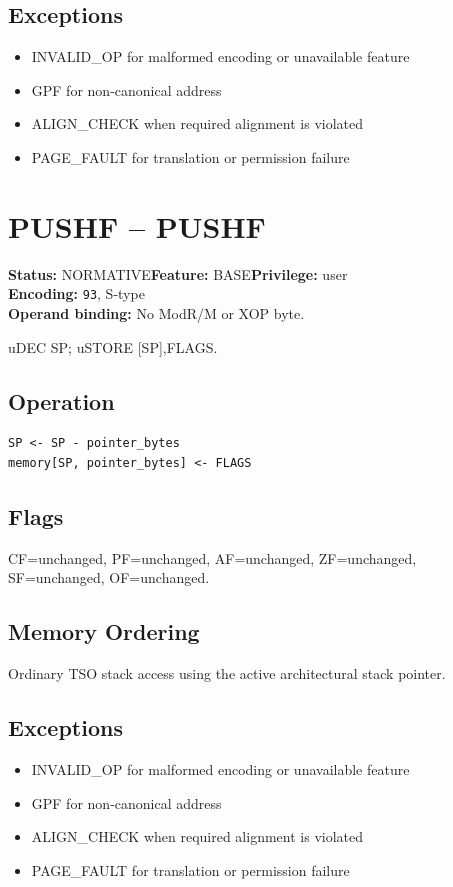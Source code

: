 \documentclass[10pt]{article}
\begin{document}
\subsection*{Exceptions}
\begin{itemize}
\item INVALID\_OP for malformed encoding or unavailable feature
\item GPF for non-canonical address
\item ALIGN\_CHECK when required alignment is violated
\item PAGE\_FAULT for translation or permission failure
\end{itemize}
\clearpage

\section{PUSHF -- PUSHF}
\textbf{Status:} NORMATIVE\quad \textbf{Feature:} BASE\quad \textbf{Privilege:} user\\
\textbf{Encoding:} \texttt{93}, S-type\\
\textbf{Operand binding:} No ModR/M or XOP byte.

uDEC SP; uSTORE [SP],FLAGS.

\subsection*{Operation}
\begin{lstlisting}
SP <- SP - pointer_bytes
memory[SP, pointer_bytes] <- FLAGS
\end{lstlisting}
\subsection*{Flags}
CF=unchanged, PF=unchanged, AF=unchanged, ZF=unchanged, SF=unchanged, OF=unchanged.
\subsection*{Memory Ordering}
Ordinary TSO stack access using the active architectural stack pointer.
\subsection*{Exceptions}
\begin{itemize}
\item INVALID\_OP for malformed encoding or unavailable feature
\item GPF for non-canonical address
\item ALIGN\_CHECK when required alignment is violated
\item PAGE\_FAULT for translation or permission failure
\end{itemize}
\clearpage
\end{document}

